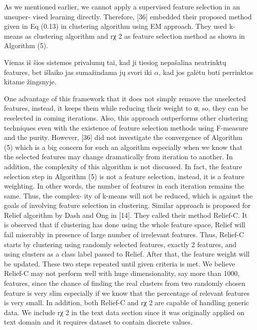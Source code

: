 \documentclass{VUMIFInfKursinis}
\begin{document}
			As we mentioned earlier, we cannot apply a supervised feature selection in an unsuper- vised learning directly. Therefore, [36] embedded their proposed method given in Eq (0.13) in clustering algorithm using EM approach. They used k-means as clustering algorithm and rχ 2 as feature selection method as shown in Algorithm (5).

			Vienas iš šios sistemos privalumų tai, kad ji tiesiog nepašalina neatrinktų features, bet išlaiko jas sumažindama jų svori iki $\alpha$, kad jos galėtu buti perrinktos kitame žingsnyje. 

			One advantage of this framework that it does not simply remove the unselected features, instead, it keeps them while reducing their weight to α, so, they can be reselected in coming iterations. Also, this approach outperforms other clustering techniques even with the existence of feature selection methods using F-measure and the purity. However, [36] did not investigate the convergence of Algorithm (5) which is a big concern for such an algorithm especially when we know that the selected features may change dramatically from iteration to another. In addition, the complexity of this algorithm is not discussed. In fact, the feature selection step in Algorithm (5) is not a feature selection, instead, it is a feature weighting. In other words, the number of features in each iteration remains the same. Thus, the complex- ity of k-means will not be reduced, which is against the goals of involving feature selection in clustering.
			Similar approach is proposed for Relief algorithm by Dash and Ong in [14]. They called their method Relief-C. It is observed that if clustering has done using the whole feature space, Relief will fail miserably in presence of large number of irrelevant features. Thus, Relief-C starts by clustering using randomly selected features, exactly 2 features, and using clusters as a class label passed to Relief. After that, the feature weight will be updated.  These two steps repeated until given criteria is met. We believe Relief-C may not perform well with huge dimensionality, say more than 1000, features, since the chance of finding the real clusters from two randomly chosen feature is very slim especially if we know that the percentage of relevant features is very small. In addition, both Relief-C and rχ 2 are capable of handling generic data. We include rχ 2 in the text data section since it was originally applied on text domain and it requires dataset to contain discrete values.
\end{document}
